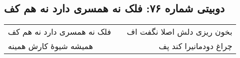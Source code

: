 \begin{center}
\section*{دوبیتی شماره ۷۶: فلک نه همسری دارد نه هم کف}
\label{sec:076}
\begin{longtable}{l p{0.5cm} r}
فلک نه همسری دارد نه هم کف
&&
بخون ریزی دلش اصلا نگفت اف
\\
همیشه شیوهٔ کارش همینه
&&
چراغ دودمانیرا کند پف
\\
\end{longtable}
\end{center}
